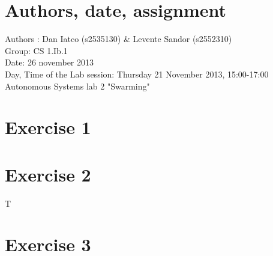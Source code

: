 \documentclass[a4paper,10pt]{article}
\begin{document}
\section*{Authors, date, assignment}
Authors : Dan Iatco (s2535130) \& Levente Sandor (s2552310)\\
Group: CS 1.Ib.1\\
Date:  26 november 2013\\
Day, Time of the Lab session: Thursday 21 November 2013, 15:00-17:00\\
Autonomous Systems lab 2 "Swarming"\\

\section*{Exercise 1}

\section*{Exercise 2}
T

\section*{Exercise 3}
\end{document}
